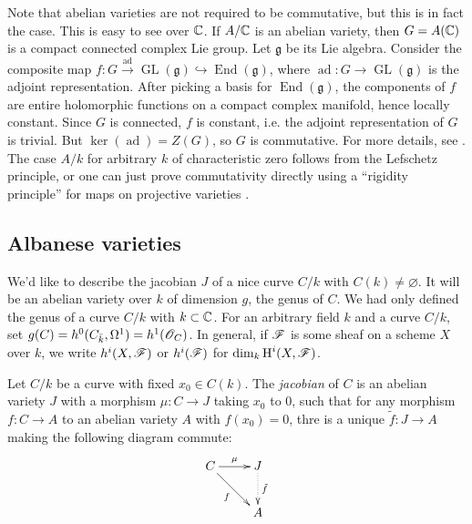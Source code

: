 \documentclass{article}
\begin{document}
Note that abelian varieties are not required to be commutative, but this is in 
fact the case. This is easy to see over $\mathbb{C}$. If $A/\mathbb{C}$ is an 
abelian variety, then $G=A(\mathbb{C})$ is a compact connected complex Lie 
group. Let $\mathfrak{g}$ be its Lie algebra. Consider the composite map 
$f:G\xrightarrow{\text{ad}}\operatorname{GL}(\mathfrak{g}) \hookrightarrow 
\operatorname{End}(\mathfrak{g})$, where 
$\operatorname{ad}:G\to\operatorname{GL}(\mathfrak{g})$ is the adjoint 
representation. After picking a basis for $\operatorname{End}(\mathfrak{g})$, 
the components of $f$ are entire holomorphic functions on a compact complex 
manifold, hence locally constant. Since $G$ is connected, $f$ is constant, i.e. 
the adjoint representation of $G$ is trivial. But 
$\ker(\operatorname{ad}) = Z(G)$, so $G$ is commutative. For more details, see 
\cite[I.1]{mu08}. The case $A/k$ for arbitrary $k$ of characteristic zero 
follows from the Lefschetz principle, or one can just prove commutativity 
directly using a ``rigidity principle'' for maps on projective varieties
\cite[I.1.4]{mi}. 





\subsection*{Albanese varieties}

We'd like to describe the jacobian $J$ of a nice curve $C/k$ with 
$C(k)\ne\varnothing$. It will be an abelian variety over $k$ of dimension 
$g$, the genus of $C$. We had only defined the genus of a curve $C/k$ with 
$k\subset \mathbb{C}$. For an arbitrary field $k$ and a curve $C/k$, set 
$g(C)=h^0(C_{\bar k},\Omega^1) = h^1(\mathscr{O}_C)$. In general, if $\mathscr{F}$ is some 
sheaf on a scheme $X$ over $k$, we write $h^i(X,\mathscr{F})$ or $h^i(\mathscr{F})$ for 
$\dim_k \operatorname{H}^i(X,\mathscr{F})$.

\begin{definition}[Albanese]
Let $C/k$ be a curve with fixed $x_0\in C(k)$. The \emph{jacobian} of $C$ is 
an abelian variety $J$ with a morphism $\mu:C\to J$ taking $x_0$ to $0$, such 
that for any morphism $f:C\to A$ to an abelian variety $A$ with $f(x_0)=0$, 
thre is a unique $\tilde f:J\to A$ making the following diagram commute:
\[\xymatrix{
  C \ar[r]^-\mu \ar[dr]_-f 
    & J \ar@{.>}[d]^-{\tilde f} \\
  & A
}\]
\end{definition}
\end{document}
